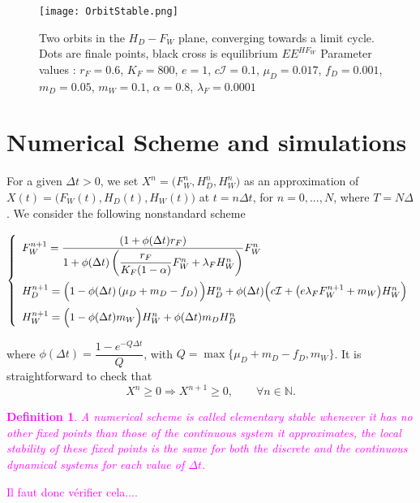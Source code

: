 \documentclass{article}
\newcommand{\lfw}{\lambda_{F}}
\newcommand{\lfw}{\lambda_{F}}
\newcommand{\YD}[1]{\textcolor{magenta}{#1}}
\newtheorem{definition}{Definition}
\begin{document}
\begin{figure}[!ht]
\centering
\texttt{[image: OrbitStable.png]}
\caption{\centering Two orbits in the $H_D - F_W$ plane, converging towards a limit cycle. Dots are finale points, black cross is equilibrium $EE^{HF_W}$ \newline
Parameter values : $r_F = 0.6$, $K_F = 800$, $e=1$, $c\mathcal{I} = 0.1$, $\mu_D = 0.017$, $f_D = 0.001$, $m_D = 0.05$, $m_W = 0.1$, $\alpha = 0.8$, $\lfw = 0.0001$}
\end{figure}


\section{Numerical Scheme and simulations}
For a given $\Delta t>0$, we set $X^n=\Big(F_W^n,H_D^n,H_W^n \Big)$ as an approximation of $X(t)=\Big(F_W(t),H_D(t),H_W(t)\Big)$ at $t=n\Delta t$, for $n=0,...,N$, where $T=N\Delta$. We consider the following nonstandard scheme

\begin{equation}
\def\arraystretch{2}
\left\{ \begin{array}{l}
F_{W}^{n+1}=\dfrac{\left(1+\phi(\Delta t)r_{F}\right)}{1+\phi(\Delta t)\left(\dfrac{r_{F}}{K_{F}(1-\alpha)}F_{W}^{n}+\lambda_{F}H_{W}^{n}\right)}F_{W}^{n}\\ 
H_{D}^{n+1}=\Big(1-\phi(\Delta t) \left(\mu_{D}+m_{D}-f_{D}\right)\Big)H_{D}^{n}+ \phi(\Delta t)\Big(c\mathcal{I}+ \big(e\lambda_{F}F_{W}^{n+1} + m_{W}\big)H_{W}^{n}\Big)\\ 
H_{W}^{n+1}=\Big(1-\phi(\Delta t)m_{W}\Big)H_{W}^n+\phi(\Delta t)m_{D}H_{D}^n
\end{array}\right.
\end{equation}

where $\phi(\Delta t)=\dfrac{1-e^{-Q\Delta t}}{Q}$, with $Q=\max\{\mu_D+m_D-f_D,m_W\}$. 
It is straightforward to check that
$$
X^n \geq 0 \Rightarrow X^{n+1}\geq 0,\qquad \forall n\in \mathbb{N}.
$$
\YD{
\begin{definition}
A numerical scheme is called elementary stable whenever it has no other fixed points than those of the continuous system it approximates, the local stability of these fixed points is the same for both the discrete and the continuous dynamical systems for each value of $\Delta t$.
\end{definition}
Il faut donc vérifier cela....
}



\end{document}
